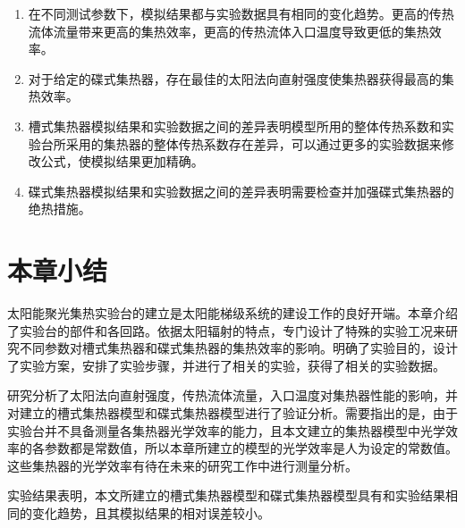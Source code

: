 \begin{enumerate}[label=(\arabic*)]
\item 在不同测试参数下，模拟结果都与实验数据具有相同的变化趋势。更高的传热流体流量带来更高的集热效率，更高的传热流体入口温度导致更低的集热效率。
\item 对于给定的碟式集热器，存在最佳的太阳法向直射强度使集热器获得最高的集热效率。
\item 槽式集热器模拟结果和实验数据之间的差异表明模型所用的整体传热系数和实验台所采用的集热器的整体传热系数存在差异，可以通过更多的实验数据来修改公式，使模拟结果更加精确。
\item 碟式集热器模拟结果和实验数据之间的差异表明需要检查并加强碟式集热器的绝热措施。
\end{enumerate}

\section{本章小结}
太阳能聚光集热实验台的建立是太阳能梯级系统的建设工作的良好开端。本章介绍了实验台的部件和各回路。依据太阳辐射的特点，专门设计了特殊的实验工况来研究不同参数对槽式集热器和碟式集热器的集热效率的影响。明确了实验目的，设计了实验方案，安排了实验步骤，并进行了相关的实验，获得了相关的实验数据。

研究分析了太阳法向直射强度，传热流体流量，入口温度对集热器性能的影响，并对建立的槽式集热器模型和碟式集热器模型进行了验证分析。需要指出的是，由于实验台并不具备测量各集热器光学效率的能力，且本文建立的集热器模型中光学效率的各参数都是常数值，所以本章所建立的模型的光学效率是人为设定的常数值。这些集热器的光学效率有待在未来的研究工作中进行测量分析。

实验结果表明，本文所建立的槽式集热器模型和碟式集热器模型具有和实验结果相同的变化趋势，且其模拟结果的相对误差较小。